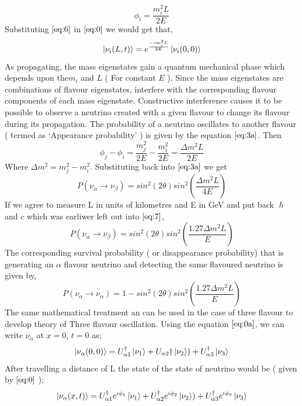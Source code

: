 \documentclass[12pt,a4paper]{report}
\begin{document}
\begin{equation}
\label{eq:6}
\phi_{i} = \frac{m_{i}^2 L}{2E}
\end{equation}
Substituting $\ref{eq:6}$  in  $\ref{eq:0}$  we would get that,
\begin{equation}
\ket{\nu_{i} (L,t)} = e^{\frac{-i m_{i}^2 L}{2E}}\ket{\nu_{i} (0,0)}
\end{equation}
As propagating, the mass eigenstates gain a quantum mechanical phase which depends upon the$ m_{i}$ and $L$ ( For constant $E$ ). Since the mass eigenstates are combinations of flavour eigenstates, interfere with the corresponding flavour components of each mass eigenstate. Constructive interference causes it to be possible to observe a neutrino created with a given flavour to change its flavour during its propagation. The probability of a neutrino oscillates to another flavour ( termed as ‘Appearance probability’ ) is given by the equation $\ref{eq:3a}$. Then 
\begin{equation}
\label{eq:6a}
\phi_{j} - \phi_{i} = \frac{m_{j}^{2}}{2E} - \frac{m_{i}^2}{2E} = \frac{\Delta m^{2} L}{2E}
\end{equation} 
Where $\Delta m^{2} = m_{j}^{2}-m_{i}^{2}$.
Substituting back into $\ref{eq:3a}$ we get 
\begin{equation}
\label{eq:7}
P(\nu_{\alpha} \rightarrow \nu_{\beta}) = sin^{2}(2\theta)sin^{2}( \frac{\Delta m^{2} L}{4E})
\end{equation}
If we agree to measure L in units of kilometres and E in GeV and put back $\hslash$ and $c$ which was earliwer left out into $\ref{eq:7}$,
\begin{equation}
\label{eq:8}
P(\nu_{\alpha} \rightarrow \nu_{\beta}) = sin^{2}(2\theta)sin^{2}( \frac{1.27\Delta m^{2} L}{E})
\end{equation}
The corresponding survival probability ( or disappearance probability) that is generating an $\alpha$ flavour neutrino and detecting the same flavoured neutrino is given by,
\begin{equation}
\label{eq:9}
P(\nu_{\alpha} \rightarrow \nu_{\alpha}) = 1-sin^{2}(2\theta) sin^{2}( \frac{1.27\Delta m^{2} L}{E})
\end{equation}
The same mathematical treatment an can be used in the case of three flavour to develop theory of Three flavour oscillation. Using the equation $\ref{eq:0a}$, we can write $\nu_{\alpha}$ at $x=0$, $t=0$ as;
\begin{equation}
\ket{\nu_{\alpha}(0,0)}= U_{\alpha 1}^{\dagger}\ket{\nu_{1}}+U_{\alpha 2}{\dagger}\ket{\nu_{2}})+ U_{\alpha 3}^{\dagger}\ket{\nu_{3}}
\end{equation}
After travelling a distance of L the state of the state of neutrino would be ( given by $\ref{eq:0}$ );
\begin{equation}
	\label{eq:10}
	\ket{\nu_{\alpha}(x,t)} = U_{\alpha 1}^{\dagger} e^{i\phi_{1}}\ket{\nu_{1}}+U_{\alpha 2}^{\dagger}e^{i\phi_{2}}\ket{\nu_{2}})+ U_{\alpha 3}^{\dagger}e^{i\phi_{3}}\ket{\nu_{3}}
\end{equation}
\end{document}
